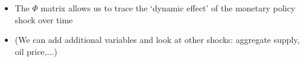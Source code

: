 \documentclass[10pt,handout]{beamer}
\DeclareRobustCommand{\hand}{%
\fontfamily{augie}\fontseries{m}\fontshape{n}\selectfont}
\begin{document}
\begin{frame}
\begin{itemize}
\begin{itemize}
\item The $\Phi $ matrix allows us to trace the `dynamic effect' of the
monetary policy shock over time\medskip 
{}
\pause \smallskip

\item (We can add additional variables and look at other shocks: aggregate
supply, oil price,...) \medskip
\end{itemize}
\end{itemize}
\end{frame}
\shownotesblock{}
\end{document}
